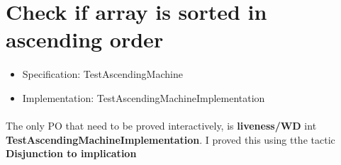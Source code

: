 \section{Check if array is sorted in ascending order}
\paragraph{}

\begin{itemize}
\item Specification: TestAscendingMachine
\item Implementation: TestAscendingMachineImplementation
\end{itemize}

\paragraph{}
The only PO that need to be proved interactively, is \textbf{liveness/WD} int \textbf{TestAscendingMachineImplementation}. I proved this using tthe tactic \textbf{Disjunction to implication}
%
%
%